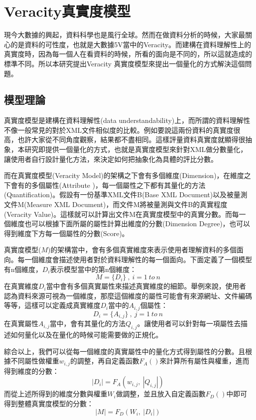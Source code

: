 \newpage
\section{Veracity真實度模型}
現今大數據的興起，資料科學也是風行全球。然而在做資料分析的時候，大家最關心的是資料的可性度，也就是大數據5V當中的Veracity。而建構在資料理解性上的真實度時，因為每一個人在看資料的時候，所看的面向是不同的，所以這就造成的標準不同。所以本研究提出Veracity 真實度模型來提出一個量化的方式解決這個問題。
\subsection{模型理論}
真實度模型是建構在資料理解性(data understandability)上，而所謂的資料理解性不像一般常見的對於XML文件相似度的比較。例如要說這兩份資料的真實度很高，也許大家從不同角度觀察，結果都不盡相同。這樣評量資料真實度就顯得很抽象，本研究即提供一個量化的方式，也就是真實度模型來針對XML做分數量化，讓使用者自行設計量化方法，來決定如何把抽象化為具體的評比分數。\\\par

而在真實度模型(Veracity Model)的架構之下會有多個維度(Dimension)，在維度之下會有的多個屬性(Attribute )，每一個屬性之下都有其量化的方法(Quantification)。假設有一份基準XML文件B(Base XML Document)以及被量測文件M(Measure XML Document)，而文件M將被量測與文件B的真實程度(Veracity Value)。這樣就可以計算出文件M在真實度模型中的真實分數。而每一個維度也可以根據下面所屬的屬性計算出維度的分數(Dimension Degree)，也可以得到維度下方每一個屬性的分數(Score)。\\\par

真實度模型($M$)的架構當中，會有多個真實維度來表示使用者理解資料的多個面向。每一個維度會描述使用者對於資料理解性的每一個面向。下面定義了一個模型有n個維度，$D_i$表示模型當中的第n個維度：
$$
M=\{D_i\}\ ,\ i= 1\ to\ n
$$
在真實維度$D_i$當中會有多個真實屬性來描述真實維度的細節。舉例來說，使用者認為資料來源可視為一個維度，那麼這個維度的屬性可能會有來源網址、文件編碼等等，這樣可以定義成真實維度$D_i$當中的$A_{i,j}$個屬性：
$$
D_i=\{A_{i,j}\}\ ,\ j=1\ to\ n
$$
在真實屬性$A_{i,j}$當中，會有其量化的方法$Q_{i,j}$。讓使用者可以針對每一項屬性去描述如何量化以及在量化的時候可能需要做的正規化。\\\par

綜合以上，我們可以從每一個維度的真實屬性中的量化方式得到屬性的分數。且根據不同屬性做權重$w_{i,j}$的調整，再自定義函數$F_A()$來計算所有屬性與權重，進而得到維度的分數：
$$
\left\lvert D_{i}\right\rvert=F_A(w_{i,j},\  \left\lvert Q_{i, j}\right\lvert)
$$
而從上述所得到的維度分數與權重$W_{i}$做調整，並且放入自定義函數$F_D()$中即可得到整體真實度模型的分數：
$$
 \left\lvert M\right\lvert=F_D(W_i,\ \left\lvert D_{i}\right\lvert)
$$

